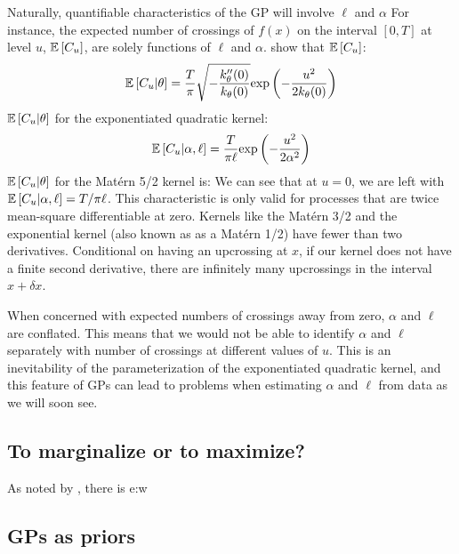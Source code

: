 \documentclass{article}
\newcommand{\Exp}[1]{\ensuremath{\mathbb{E} \lb #1 \rb}}
\newcommand{\lb}{\ensuremath{\left[}}
\newcommand{\rb}{\ensuremath{\right]}}
\begin{document}
Naturally, quantifiable characteristics of the GP will involve $\ell$ and $\alpha$ 
For instance, the expected number of crossings of $f(x)$ on the interval $[0,
T]$ at level $u$, $\Exp{C_u}$, are solely functions of $\ell$ and $\alpha$. 
\citet{cramer2004stationary} show that $\Exp{C_u}$:
\begin{align*} 
  \Exp{C_u | \theta} = \dfrac{T}{\pi} 
\sqrt{-\dfrac{k_\theta^{\prime \prime}(0)}{k_\theta(0)}}
  \text{exp}\left(-\dfrac{u^2}{2k_\theta(0)}\right)
\end{align*} 
$\Exp{C_u | \theta}$ for the exponentiated quadratic kernel:
\begin{align*} 
  \Exp{C_u | \alpha, \ell} = \dfrac{T}{\pi \ell}\text{exp}\left(-\dfrac{u^2}{2 \alpha ^ 2} \right)
\end{align*} 
$\Exp{C_u | \theta}$ for the Mat\'{e}rn 5/2 kernel is:
We can see that at $u = 0$, we are left with $\Exp{C_u | \alpha, \ell} = T /
\pi \ell$.  This characteristic is only valid for processes that are twice
mean-square differentiable at zero. Kernels like the Mat\'{e}rn 3/2 and the
exponential kernel (also known as as a Mat\'{e}rn 1/2) have fewer than two
derivatives.  Conditional on having an upcrossing at $x$, if our kernel does
not have a finite second derivative, there are infinitely many upcrossings in
the interval $x + \delta x$.

When concerned with expected numbers of crossings away from zero, $\alpha$ and
$\ell$ are conflated.  This means that we would not be able to identify
$\alpha$ and $\ell$ separately with number of crossings at different values of
$u$.  This is an inevitability of the parameterization of the exponentiated
quadratic kernel, and this feature of GPs can lead to problems when estimating
$\alpha$ and $\ell$ from data as we will soon see.

\subsection{To marginalize or to maximize?}

As noted by \citet{vehtariloo}, there is e:w

\subsection{GPs as priors}
\end{document}
